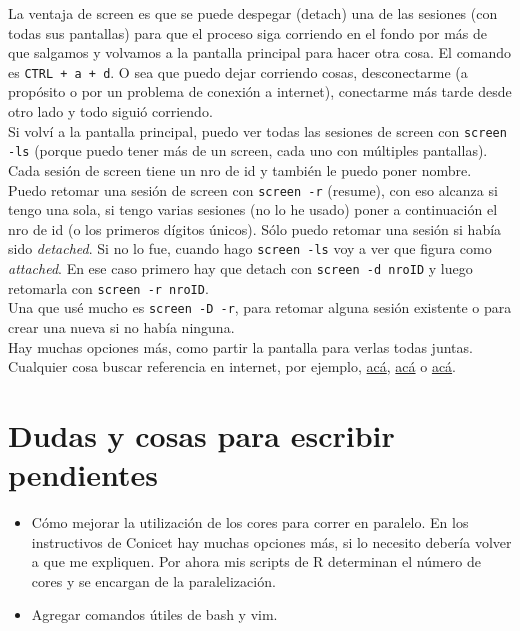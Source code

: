 \documentclass[paper=a4, fontsize=11pt]{article} %
\numberwithin{equation}{section} %
\numberwithin{figure}{section} %
\numberwithin{table}{section} %
\begin{document}
La ventaja de screen es que se puede despegar (detach) una de las sesiones (con todas sus pantallas) para que el proceso siga corriendo en el fondo por más de que salgamos y volvamos a la pantalla principal para hacer otra cosa. El comando es \texttt{CTRL + a + d}. O sea que puedo dejar corriendo cosas, desconectarme (a propósito o por un problema de conexión a internet), conectarme más tarde desde otro lado y todo siguió corriendo. \\

Si volví a la pantalla principal, puedo ver todas las sesiones de screen con \texttt{screen -ls} (porque puedo tener más de un screen, cada uno con múltiples pantallas). Cada sesión de screen tiene un nro de id y también le puedo poner nombre. Puedo retomar una sesión de screen con \texttt{screen -r} (resume), con eso alcanza si tengo una sola, si tengo varias sesiones (no lo he usado) poner a continuación el nro de id (o los primeros dígitos únicos). Sólo puedo retomar una sesión si había sido \textit{detached}. Si no lo fue, cuando hago \texttt{screen -ls} voy a ver que figura como \textit{attached}. En ese caso primero hay que detach con \texttt{screen -d nroID} y luego retomarla con \texttt{screen -r nroID}.\\
 
Una que usé mucho es \texttt{screen -D -r}, para retomar alguna sesión existente o para crear una nueva si no había ninguna.\\

Hay muchas opciones más, como partir la pantalla para verlas todas juntas. Cualquier cosa buscar referencia en internet, por ejemplo, \href{https://ma.ttias.be/screen-a-must-for-ssh/}{acá}, \href{https://linuxize.com/post/how-to-use-linux-screen/}{acá} o \href{https://www.howtogeek.com/howto/ubuntu/keep-your-ssh-session-running-when-you-disconnect/}{acá}.

\section{Dudas y cosas para escribir pendientes}

\begin{itemize}
	\item Cómo mejorar la utilización de los cores para correr en paralelo. En los instructivos de Conicet hay muchas opciones más, si lo necesito debería volver a que me expliquen. Por ahora mis scripts de R determinan el número de cores y se encargan de la paralelización.

	\item Agregar comandos útiles de bash y vim.
\end{itemize}
\end{document}
